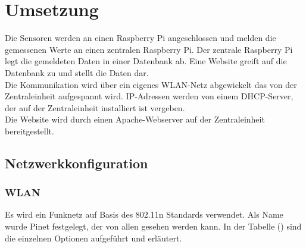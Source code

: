\chapter{Umsetzung}

Die Sensoren werden an einen Raspberry Pi angeschlossen und melden die
gemessenen Werte an einen zentralen Raspberry Pi. Der zentrale Raspberry Pi legt
die gemeldeten Daten in einer Datenbank ab. Eine Website greift auf die
Datenbank zu und stellt die Daten dar.\\
Die Kommunikation wird über ein eigenes WLAN-Netz abgewickelt das von der
Zentraleinheit aufgespannt wird. IP-Adressen werden von einem DHCP-Server, der
auf der Zentraleinheit installiert ist vergeben.\\
Die Website wird durch einen Apache-Webserver auf der Zentraleinheit
bereitgestellt.

\section{Netzwerkkonfiguration}

\subsection{WLAN}
Es wird ein Funknetz auf Basis des 802.11n Standards verwendet. Als Name wurde
Pinet festgelegt, der von allen gesehen werden kann. In der Tabelle
() sind die einzelnen Optionen
aufgeführt und erläutert.


